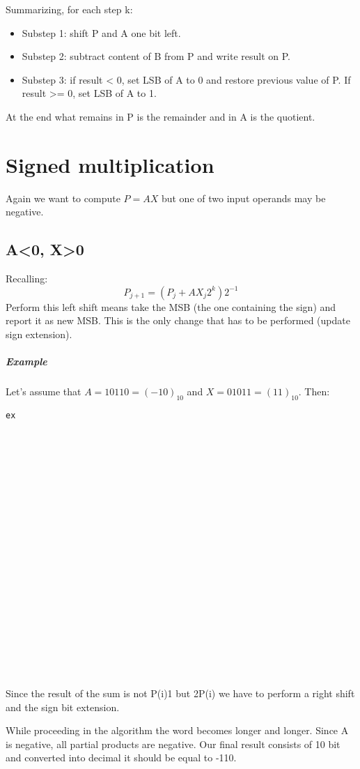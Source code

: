 Summarizing, for each step k:

\begin{itemize}
  \item Substep 1: shift P and A one bit left.
  \item Substep 2: subtract content of B from P and write result on P.
  \item Substep 3: if result < 0, set LSB of A to 0 and restore previous value of P.
  If result >= 0, set LSB of A to 1.
\end{itemize}

At the end what remains in P is the remainder and in A is the quotient.

\section{Signed multiplication}
Again we want to compute $P=AX$ but one of two input operands may be negative.

\subsection{A<0, X>0}
Recalling:
$$P_{j+1}=(P_j+A X_j 2^k)2^{-1}$$
Perform this left shift means take the MSB (the one containing the sign) and report it as new MSB. This is the only change that has to be performed (update sign extension).

\subparagraph{Example}
Let's assume that $A=10110=(-10)_{10}$ and $X=01011=(11)_{10}$. Then:

\begin{verbatim}
ex























\end{verbatim}

Since the result of the sum is not P(i)1 but 2P(i) we have to perform a right shift and the sign bit extension.

While proceeding in the algorithm the word becomes longer and longer. Since A is negative, all partial products are negative. Our final result consists of 10 bit and converted into decimal it should be equal to -110.

